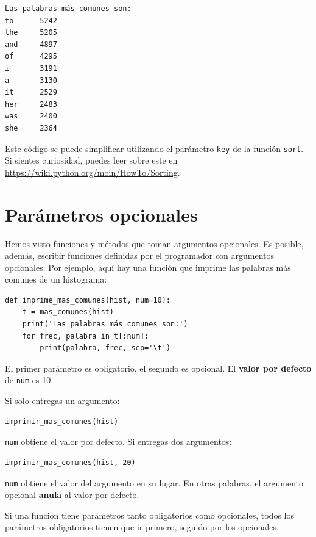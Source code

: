 \documentclass[10pt]{book}
\begin{document}
\begin{verbatim}
Las palabras más comunes son:
to      5242
the     5205
and     4897
of      4295
i       3191
a       3130
it      2529
her     2483
was     2400
she     2364
\end{verbatim}
%
Este código se puede simplificar utilizando el parámetro {\tt key} de
la función {\tt sort}.  Si sientes curiosidad, puedes leer sobre este
en \url{https://wiki.python.org/moin/HowTo/Sorting}.


\section{Parámetros opcionales}

Hemos visto funciones y métodos que toman argumentos
opcionales.  Es posible, además, escribir funciones definidas por el programador
con argumentos opcionales.  Por ejemplo, aquí hay una función que
imprime las palabras más comunes de un histograma:

\begin{verbatim}
def imprime_mas_comunes(hist, num=10):
    t = mas_comunes(hist)
    print('Las palabras más comunes son:')
    for frec, palabra in t[:num]:
        print(palabra, frec, sep='\t')
\end{verbatim}

El primer parámetro es obligatorio, el segundo es opcional.
El {\bf valor por defecto} de {\tt num} es 10.

Si solo entregas un argumento:

\begin{verbatim}
imprimir_mas_comunes(hist)
\end{verbatim}

{\tt num} obtiene el valor por defecto.  Si entregas dos argumentos:

\begin{verbatim}
imprimir_mas_comunes(hist, 20)
\end{verbatim}

{\tt num} obtiene el valor del argumento en su lugar.  En otras
palabras, el argumento opcional {\bf anula} al valor por defecto.

Si una función tiene parámetros tanto obligatorios como opcionales, todos
los parámetros obligatorios tienen que ir primero, seguido por los
opcionales.
\end{document}
